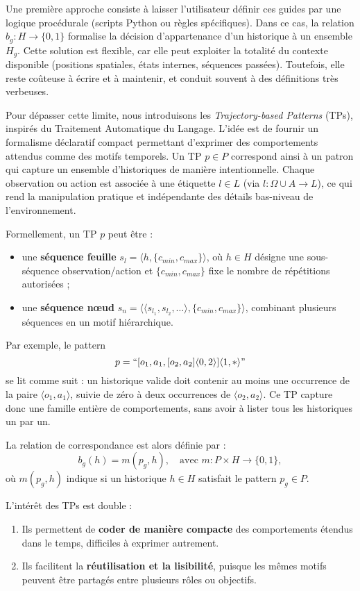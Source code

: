 \documentclass[francais,ROIA,Unicode,manuscript]{cedram}
\begin{document}
Une première approche consiste à laisser l’utilisateur définir ces guides par une logique procédurale (scripts Python ou règles spécifiques). Dans ce cas, la relation \(b_g: H \to \{0,1\}\) formalise la décision d’appartenance d’un historique à un ensemble \(H_g\). Cette solution est flexible, car elle peut exploiter la totalité du contexte disponible (positions spatiales, états internes, séquences passées). Toutefois, elle reste coûteuse à écrire et à maintenir, et conduit souvent à des définitions très verbeuses.

Pour dépasser cette limite, nous introduisons les \textit{Trajectory-based Patterns} (TPs), inspirés du Traitement Automatique du Langage. L’idée est de fournir un formalisme déclaratif compact permettant d’exprimer des comportements attendus comme des motifs temporels. Un TP \(p \in P\) correspond ainsi à un patron qui capture un ensemble d’historiques de manière intentionnelle. Chaque observation ou action est associée à une étiquette \(l \in L\) (via \(l: \Omega \cup A \to L\)), ce qui rend la manipulation pratique et indépendante des détails bas-niveau de l’environnement.

Formellement, un TP \(p\) peut être :
\begin{itemize}
    \item une \textbf{séquence feuille} \(s_l = \langle h, \{c_{min}, c_{max}\} \rangle\), où \(h \in H\) désigne une sous-séquence observation/action et \(\{c_{min}, c_{max}\}\) fixe le nombre de répétitions autorisées ;
    \item une \textbf{séquence nœud} \(s_n = \langle \langle s_{l_1}, s_{l_2}, \dots \rangle, \{c_{min}, c_{max}\} \rangle\), combinant plusieurs séquences en un motif hiérarchique.
\end{itemize}

Par exemple, le pattern
\[
    p = ``[o_1,a_1,[o_2,a_2]\langle0,2\rangle]\langle1,*\rangle"
\]
se lit comme suit : un historique valide doit contenir au moins une occurrence de la paire \(\langle o_1,a_1\rangle\), suivie de zéro à deux occurrences de \(\langle o_2,a_2\rangle\). Ce TP capture donc une famille entière de comportements, sans avoir à lister tous les historiques un par un.

La relation de correspondance est alors définie par :
\[
    b_g(h) = m(p_g,h), \quad \text{avec } m: P \times H \to \{0,1\},
\]
où \(m(p_g,h)\) indique si un historique \(h \in H\) satisfait le pattern \(p_g \in P\).

L’intérêt des TPs est double :
\begin{enumerate}
    \item Ils permettent de \textbf{coder de manière compacte} des comportements étendus dans le temps, difficiles à exprimer autrement.
    \item Ils facilitent la \textbf{réutilisation et la lisibilité}, puisque les mêmes motifs peuvent être partagés entre plusieurs rôles ou objectifs.
\end{enumerate}
\end{document}

